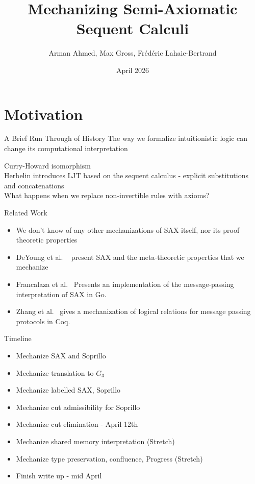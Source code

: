 \documentclass[9ps]{beamer}
\title{Mechanizing Semi-Axiomatic Sequent Calculi}
\author{Arman Ahmed, Max Gross, Fr\'{e}d\'{e}ric Lahaie-Bertrand}
\date{April 2026}
\begin{document}
\maketitle

\section{Motivation}
\begin{frame} {A Brief Run Through of History}
  The way we formalize intuitionistic logic can change its computational interpretation 
  \medskip{}

  \qquad Curry-Howard isomorphism \\
  \qquad Herbelin \cite{Herbelin} introduces LJT based on the sequent calculus - explicit substitutions and concatenations \\
  \qquad What happens when we replace non-invertible rules with axioms?



\end{frame}

\begin{frame} {Related Work}
    \begin{itemize}
        \item We don't know of any other mechanizations of SAX itself, nor its proof theoretic properties
        \item DeYoung et al. ~\cite{DeYoung2020} present SAX and the meta-theoretic properties that we mechanize
        \item Francalaza et al.~\cite{FrancalanzaTP24} Presents an implementation of the message-passing interpretation of SAX in Go. 
        \item Zhang et al.~\cite{zhang2025} gives a mechanization of logical relations for message passing protocols in Coq.
    \end{itemize}

\end{frame}

\begin{frame}{Timeline}
  \begin{itemize}
    \item Mechanize SAX and Soprillo  \checkmark
    \item Mechanize translation to $G_3$  \checkmark
    \item Mechanize labelled SAX, Soprillo  \checkmark
    \item Mechanize cut admissibility for Soprillo  \checkmark
    \item Mechanize cut elimination - April 12th 
    \item Mechanize shared memory interpretation (Stretch)  
    \item Mechanize type preservation, confluence, Progress (Stretch)
    \item Finish write up - mid April
  \end{itemize} 
\end{frame}


\end{document}
